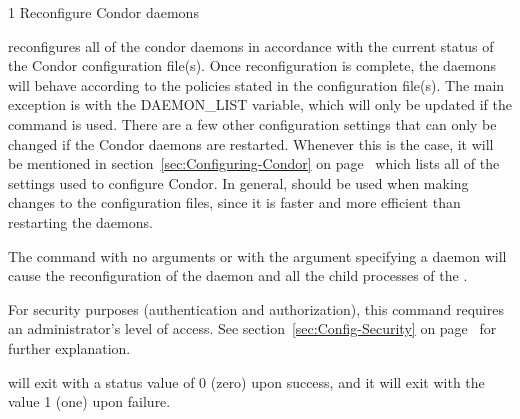 \begin{ManPage}{\label{man-condor-reconfig}}{1}
{Reconfigure Condor daemons}
\Synopsis {}
\ToolArgsBase

\ToolArgsLocate
\ToolArgsAffect
{}

\ToolWhere
\ToolArgsAffect
{}


\Description 

 reconfigures all of the condor daemons in accordance with 
the current
status of the Condor configuration file(s).  
Once reconfiguration is complete, the daemons will behave according to
the policies stated in the configuration file(s).
The main exception is with the DAEMON\_LIST variable, which will only be
updated if the  command is used.  
There are a few other configuration settings that can only be changed
if the Condor daemons are restarted.
Whenever this is the case, it will be mentioned in
section~\ref{sec:Configuring-Condor} on
page~\pageref{sec:Configuring-Condor} which lists all of the settings
used to configure Condor. 
In general,  should be used when making changes to
the configuration files, since it is faster and more efficient than
restarting the daemons.

The command 
with no arguments or with the  argument specifying
a daemon will cause the reconfiguration of the 
daemon and all the child processes of the .

For security purposes (authentication and authorization),
this command requires an administrator's level of access.
See
section~\ref{sec:Config-Security} on page~\pageref{sec:Config-Security}
for further explanation.

\begin{Options}
    \ToolArgsBaseDesc
    \ToolArgsLocateDesc
\end{Options}

\ExitStatus

 will exit with a status value of 0 (zero) upon success,
and it will exit with the value 1 (one) upon failure.


\end{ManPage}
